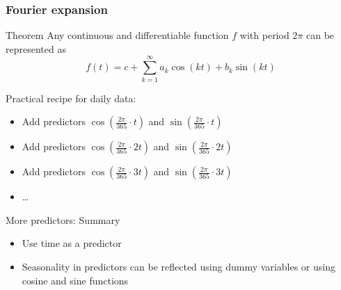 \begin{frame}
	\frametitle{Fourier expansion}
	
	\begin{block}{Theorem}
		Any continuous and differentiable function $f$ with period $2\pi$ can be represented as
		\[
		f(t) = c + \sum_{k=1}^{\infty} a_k \cos(kt) + b_k \sin (kt)
		\]
	\end{block}
	
	\pause
	Practical recipe for daily data:
	\begin{itemize}[<+->]
		\item Add predictors $\cos\left(\frac{2\pi}{365} \cdot t\right)$ and $\sin\left(\frac{2\pi}{365} \cdot t\right) $
		\item Add predictors $\cos\left(\frac{2\pi}{365} \cdot 2t\right)$ and $\sin\left(\frac{2\pi}{365} \cdot 2t\right) $
		\item Add predictors $\cos\left(\frac{2\pi}{365} \cdot 3t\right)$ and $\sin\left(\frac{2\pi}{365} \cdot 3t\right) $
		\item \ldots
	\end{itemize}
	
	
	
	
\end{frame}

\begin{frame}{More predictors: Summary}
	
	\begin{itemize}[<+->]
		\item Use \alert{time} as a predictor
		\item Seasonality in predictors can be reflected using \alert{dummy variables} or
		using \alert{cosine} and \alert{sine} functions
	\end{itemize}
\end{frame}